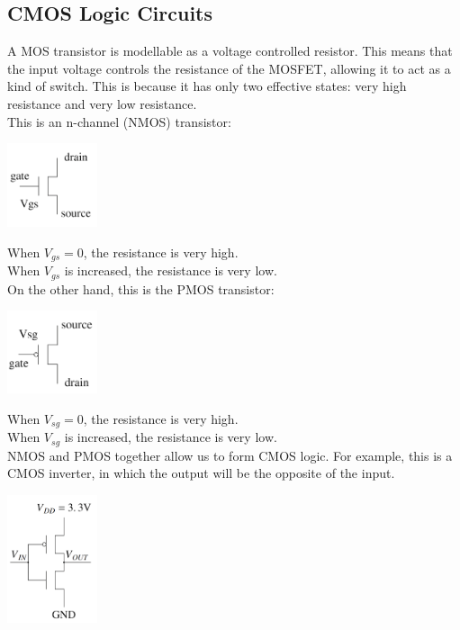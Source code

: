 \documentclass[nobib]{tufte-handout}
\begin{document}
\subsection{CMOS Logic Circuits}
A MOS transistor is modellable as a voltage controlled resistor. This means
that the input voltage controls the resistance of the MOSFET, allowing it to
act as a kind of switch. This is because it has only two effective states: very
high resistance and very low resistance.\\ This is an n-channel (NMOS)
transistor:
\begin{center}
    \includegraphics[width= 100px]{images/nmos.png}
\end{center}
When $V_{gs} = 0$, the resistance is very high.\\
When $V_{gs}$ is increased, the resistance is very low.\\
On the other hand, this is the PMOS transistor:\\
\begin{center}
    \includegraphics[width= 100px]{images/pmos.png}
\end{center}
When $V_{sg} = 0$, the resistance is very high.\\
When $V_{sg}$ is increased, the resistance is very low.\\
NMOS and PMOS together allow us to form CMOS logic.
For example, this is a CMOS inverter, in which the output will be the opposite of the input.\\
\begin{center}
    \includegraphics[width= 100px]{images/cmosinverter.png}
\end{center}
\end{document}
